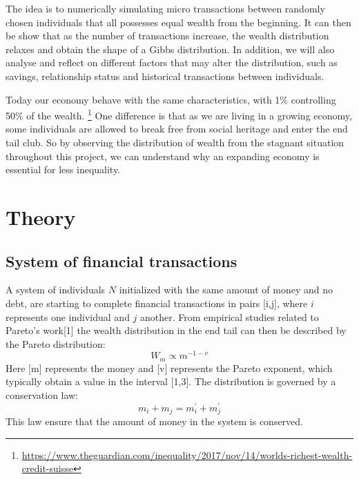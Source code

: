 \documentclass[a4paper,11pt]{article}
\begin{document}
The idea is to numerically simulating micro transactions between randomly chosen individuals that all possesses equal wealth from the beginning. It can then be show that as the number of transactions increase, the wealth distribution relaxes and obtain the shape of a Gibbs distribution. In addition, we will also analyse and reflect on different factors that may alter the distribution, such as savings, relationship status and historical transactions between individuals.
\\
\par
Today our economy behave with the same characteristics, with 1\% controlling 50\% of the wealth. \footnote{\url{https://www.theguardian.com/inequality/2017/nov/14/worlds-richest-wealth-credit-suisse}} One difference is that as we are living in a growing economy, some individuals are allowed to break free from social heritage and enter the end tail club. So by observing the distribution of wealth from the stagnant situation throughout this project, we can understand why an expanding economy is essential for less inequality.

\section{Theory}
	\subsection{System of financial transactions}
A system of individuals $N$ initialized with the same amount of money and no debt, are starting to complete financial transactions in pairs [i,j], where $i$ represents one individual and $j$ another. From empirical studies related to Pareto's work[1] the wealth distribution in the end tail can then be described by the Pareto distribution:
\begin{equation}
	W_m \propto m^{-1-v}
\end{equation}
Here [m] represents the money and [v] represents the Pareto exponent, which typically obtain a value in the interval [1,3]. The distribution is governed by a conservation law:
\begin{equation}
	m_i+m_j = m{^\prime_i}+m{^\prime_j}
\end{equation}
This law ensure that the amount of money in the system is conserved.
\end{document}
